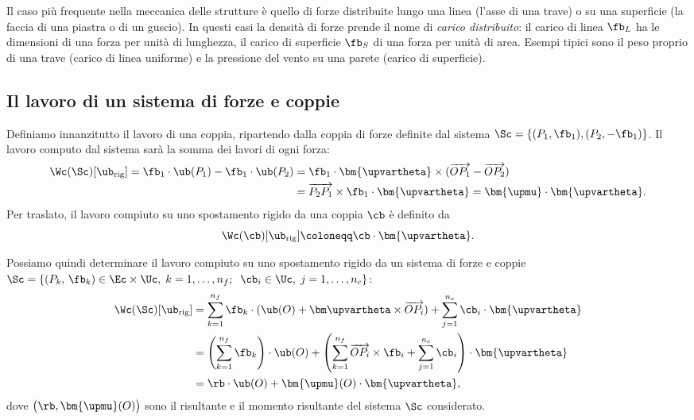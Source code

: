 \begin{oss}
	Il caso più frequente nella meccanica delle strutture è
	quello di forze distribuite lungo una linea (l'asse di una
	trave) o su una superficie (la faccia di una piastra o di
	un guscio). In questi casi la densità di forze prende il
	nome di \textit{carico distribuito}: il carico di linea
	$\fb_L$ ha le dimensioni di una forza per unità di
	lunghezza, il carico di superficie $\fb_S$ di una forza
	per unità di area. Esempi tipici sono il peso proprio di
	una trave (carico di linea uniforme) e la pressione del
	vento su una parete (carico di superficie).
\end{oss}


\subsection{Il lavoro di un sistema di forze e coppie}
Definiamo innanzitutto il lavoro di una coppia, ripartendo dalla coppia di forze definite dal sistema
$\Sc=\{(P_1, \fb_1), (P_2, -\fb_1)\}$. Il lavoro computo dal sistema sarà la somma dei lavori di ogni forza:
\begin{equation}
\begin{aligned}
		\Wc(\Sc)[\ub_{\rm rig}]=\fb_1\cdot\ub(P_1)-\fb_1\cdot \ub(P_2)&=\fb_1\cdot \bm{\upvartheta}\times(\overrightarrow{OP_1}-\overrightarrow{OP_2})\\
		&=\overrightarrow{P_2P_1}\times \fb_1\cdot\bm{\upvartheta}=\bm{\upmu}\cdot \bm{\upvartheta}.
\end{aligned}
\end{equation}
Per traslato, il lavoro compiuto su uno spostamento rigido da una coppia $\cb$ è definito da
\begin{equation}
	\Wc(\cb)[\ub_{\rm rig}]\coloneqq \cb\cdot \bm{\upvartheta}.
\end{equation}

Possiamo quindi determinare il lavoro compiuto su uno spostamento rigido da un sistema di forze e coppie $\Sc=\{(P_k,\,\fb_k) \in \Ec\times\Uc, \;k=1,\dots,n_f; \;\; \cb_i\in\Uc, \; j=1, \dots, n_c\}$:
\begin{equation}
\begin{aligned}\label{LavSis}
	\Wc(\Sc)[\ub_{\rm rig}]&=\sum_{k=1}^{n_f}\fb_k\cdot(\ub(O)+\bm\upvartheta\times \overrightarrow{OP_i})+\sum_{j=1}^{n_c}\cb_i\cdot \bm{\upvartheta}\\
	&=\left(\sum_{k=1}^{n_f} \fb_k\right)\cdot\ub(O)+\left( \sum_{k=1}^{n_f} \overrightarrow{OP_i}\times\fb_i  +\sum_{j=1}^{n_c}\cb_i\right)\cdot \bm{\upvartheta}\\
	&=\rb\cdot\ub(O)+\bm{\upmu}(O)\cdot \bm{\upvartheta},
\end{aligned}
\end{equation}
dove $\big(\rb,\bm{\upmu}(O)\big)$ sono il risultante e il momento risultante del sistema $\Sc$ considerato.

